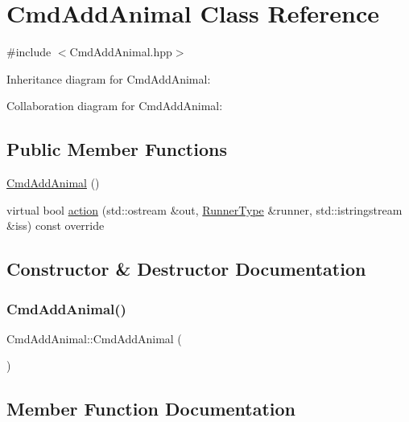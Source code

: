\hypertarget{classCmdAddAnimal}{}\section{Cmd\+Add\+Animal Class Reference}
\label{classCmdAddAnimal}


{\ttfamily \#include $<$Cmd\+Add\+Animal.\+hpp$>$}



Inheritance diagram for Cmd\+Add\+Animal\+:


Collaboration diagram for Cmd\+Add\+Animal\+:
\subsection*{Public Member Functions}
\begin{DoxyCompactItemize}
\item 
\hyperlink{classCmdAddAnimal_a53acc58f8af1e77ec7198eee0978016a}{Cmd\+Add\+Animal} ()
\item 
virtual bool \hyperlink{classCmdAddAnimal_acfb8ac5edc6bab8eab9a9856944721af}{action} (std\+::ostream \&out, \hyperlink{Command_8hpp_a3594ceaf3c835811a9a67810e7af19f9}{Runner\+Type} \&runner, std\+::istringstream \&iss) const override
\end{DoxyCompactItemize}


\subsection{Constructor \& Destructor Documentation}
\mbox{\label{classCmdAddAnimal_a53acc58f8af1e77ec7198eee0978016a}} 
\subsubsection{\texorpdfstring{Cmd\+Add\+Animal()}{CmdAddAnimal()}}
{\footnotesize\ttfamily Cmd\+Add\+Animal\+::\+Cmd\+Add\+Animal (\begin{DoxyParamCaption}{ }\end{DoxyParamCaption})}



\subsection{Member Function Documentation}
\mbox{\label{classCmdAddAnimal_acfb8ac5edc6bab8eab9a9856944721af}} 
